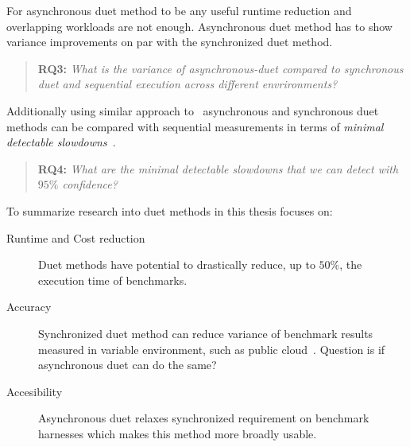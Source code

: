 For asynchronous duet method to be any useful runtime reduction and overlapping workloads are not enough.
Asynchronous duet method has to show variance improvements on par with the synchronized duet method.

\begin{quote}
	\textbf{RQ3:} \emph{What is the variance of asynchronous-duet compared to synchronous duet and sequential execution across different envrironments?}
\end{quote}

Additionally using similar approach to~\citet{laaber2019software} asynchronous and synchronous duet methods can be compared with sequential measurements in terms of \emph{minimal detectable slowdowns}~.

\begin{quote}
	\textbf{RQ4:} \emph{What are the minimal detectable slowdowns that we can detect with $95\%$ confidence?}
\end{quote}

To summarize research into duet methods in this thesis focuses on:
\begin{description}
	\item[Runtime and Cost reduction] Duet methods have potential to drastically reduce, up to $50\%$, the execution time of benchmarks.
	\item[Accuracy] Synchronized duet method can reduce variance of benchmark results measured in variable environment, such as public cloud~\citet{bulej2020duet}. Question is if asynchronous duet can do the same?
	\item[Accesibility] Asynchronous duet relaxes synchronized requirement on benchmark harnesses which makes this method more broadly usable.
\end{description}
